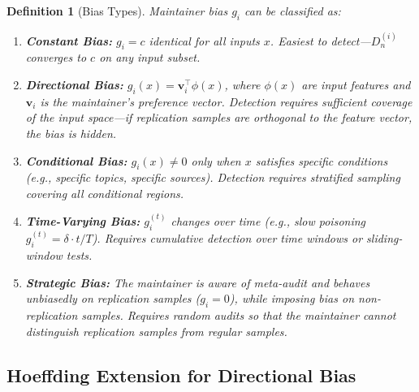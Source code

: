 \documentclass[11pt,a4paper]{article}
\newtheorem{definition}[theorem]{Definition}
\theoremstyle{definition}
\begin{document}
\begin{definition}[Bias Types]
\label{def:bias_taxonomy}
Maintainer bias $g_i$ can be classified as:
\begin{enumerate}[label=\textbf{B\arabic*}, leftmargin=*]
    \item \textbf{Constant Bias:} $g_i = c$ identical for all inputs $x$. Easiest to detect---$D_n^{(i)}$ converges to $c$ on any input subset.
    \item \textbf{Directional Bias:} $g_i(x) = \mathbf{v}_i^{\top} \phi(x)$, where $\phi(x)$ are input features and $\mathbf{v}_i$ is the maintainer's preference vector. Detection requires sufficient coverage of the input space---if replication samples are orthogonal to the feature vector, the bias is hidden.
    \item \textbf{Conditional Bias:} $g_i(x) \neq 0$ only when $x$ satisfies specific conditions (e.g., specific topics, specific sources). Detection requires stratified sampling covering all conditional regions.
    \item \textbf{Time-Varying Bias:} $g_i^{(t)}$ changes over time (e.g., slow poisoning $g_i^{(t)} = \delta \cdot t/T$). Requires cumulative detection over time windows or sliding-window tests.
    \item \textbf{Strategic Bias:} The maintainer is aware of meta-audit and behaves unbiasedly on replication samples ($g_i = 0$), while imposing bias on non-replication samples. Requires random audits so that the maintainer cannot distinguish replication samples from regular samples.
\end{enumerate}
\end{definition}

\subsection{Hoeffding Extension for Directional Bias}
\end{document}
